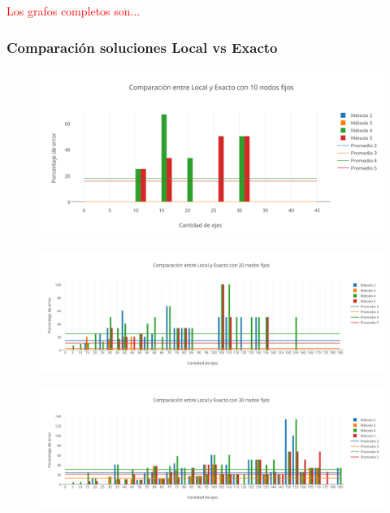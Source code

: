 \textcolor{red}{Los grafos completos son... } 
 
\newpage
\subsubsection{Comparaci\'on soluciones Local vs Exacto}

  \begin{figure}[h!]
   \begin{center}
 	\includegraphics[scale=0.75]{imagenes/local/exacto/10nodos.png}
   \end{center}
 \end{figure}

  \begin{figure}[h!]
   \begin{center}
 	\includegraphics[scale=0.55]{imagenes/local/exacto/20nodos.png}
   \end{center}
 \end{figure}
 
   \begin{figure}[h!]
   \begin{center}
 	\includegraphics[scale=0.55]{imagenes/local/exacto/30nodos.png}
   \end{center}
 \end{figure}

